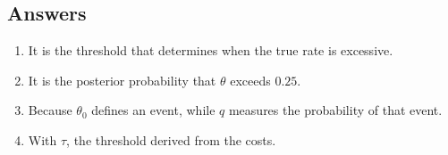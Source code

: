 \documentclass[11pt,letter]{article}
\begin{document}
\subsection*{Answers}

\begin{enumerate}
  \item It is the threshold that determines when the true rate is excessive.
  \item It is the posterior probability that $\theta$ exceeds $0.25$.
  \item Because $\theta_0$ defines an event, while $q$ measures the probability
        of that event.
  \item With $\tau$, the threshold derived from the costs.
\end{enumerate}
\end{document}
